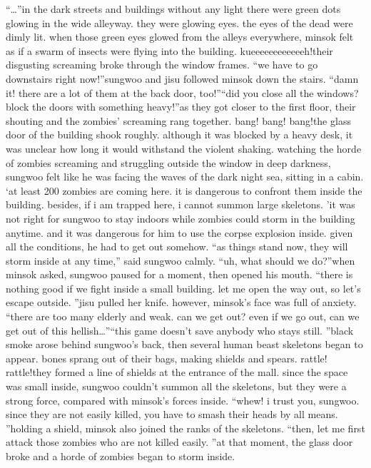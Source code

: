 “…”in the dark streets and buildings without any light there were green dots glowing in the wide alleyway.
 they were glowing eyes.
the eyes of the dead were dimly lit.
 when those green eyes glowed from the alleys everywhere, minsok felt as if a swarm of insects were flying into the building.
kueeeeeeeeeeeeh!their disgusting screaming broke through the window frames.
“we have to go downstairs right now!”sungwoo and jisu followed minsok down the stairs.
“damn it! there are a lot of them at the back door, too!”“did you close all the windows? block the doors with something heavy!”as they got closer to the first floor, their shouting and the zombies’ screaming rang together.
bang! bang! bang!the glass door of the building shook roughly.
 although it was blocked by a heavy desk, it was unclear how long it would withstand the violent shaking.
watching the horde of zombies screaming and struggling outside the window in deep darkness, sungwoo felt like he was facing the waves of the dark night sea, sitting in a cabin.
‘at least 200 zombies are coming here.
 it is dangerous to confront them inside the building.
 besides, if i am trapped here, i cannot summon large skeletons.
’it was not right for sungwoo to stay indoors while zombies could storm in the building anytime.
and it was dangerous for him to use the corpse explosion inside.
 given all the conditions, he had to get out somehow.
“as things stand now, they will storm inside at any time,” said sungwoo calmly.
“uh, what should we do?”when minsok asked, sungwoo paused for a moment, then opened his mouth.
“there is nothing good if we fight inside a small building.
 let me open the way out, so let’s escape outside.
”jisu pulled her knife.
 however, minsok’s face was full of anxiety.
“there are too many elderly and weak.
 can we get out? even if we go out, can we get out of this hellish…”“this game doesn’t save anybody who stays still.
”black smoke arose behind sungwoo’s back, then several human beast skeletons began to appear.
 bones sprang out of their bags, making shields and spears.
rattle! rattle!they formed a line of shields at the entrance of the mall.
 since the space was small inside, sungwoo couldn’t summon all the skeletons, but they were a strong force, compared with minsok’s forces inside.
“whew! i trust you, sungwoo.
 since they are not easily killed, you have to smash their heads by all means.
”holding a shield, minsok also joined the ranks of the skeletons.
“then, let me first attack those zombies who are not killed easily.
”at that moment, the glass door broke and a horde of zombies began to storm inside.
